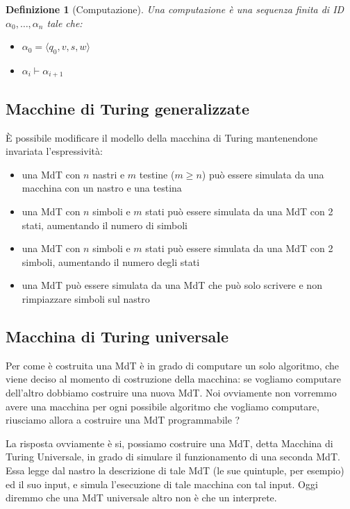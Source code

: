 \documentclass[a4paper,titlepage]{article}
\newtheorem{definition}{Definizione}[section]
\theoremstyle{definition}
\begin{document}
\begin{definition}[Computazione]
	Una computazione è una sequenza finita di ID $\alpha_0,\dots,\alpha_n$ tale che:
	\begin{itemize}
		\item $\alpha_0 = \langle q_0,v,s,w\rangle$
		\item $\alpha_i\vdash\alpha_{i+1}$
	\end{itemize}
\end{definition}

\subsection{Macchine di Turing generalizzate}
È possibile modificare il modello della macchina di Turing mantenendone invariata l'espressività:
\begin{itemize}
	\item una MdT con $n$ nastri e $m$ testine ($m\geq n$) può essere simulata da una macchina con un nastro e una testina
	\item una MdT con $n$ simboli e $m$ stati può essere simulata da una MdT con 2 stati, aumentando il numero di simboli
	\item una MdT con $n$ simboli e $m$ stati può essere simulata da una MdT con 2 simboli, aumentando il numero degli stati 
	\item una MdT può essere simulata da una MdT che può solo scrivere e non rimpiazzare simboli sul nastro
\end{itemize}

\subsection{Macchina di Turing universale}
Per come è costruita una MdT è in grado di computare un solo algoritmo, che viene deciso al momento di costruzione della macchina: se vogliamo computare dell'altro dobbiamo costruire una nuova MdT. Noi ovviamente non vorremmo avere una macchina per ogni possibile algoritmo che vogliamo computare, riusciamo allora a costruire una MdT programmabile ?

La risposta ovviamente è si, possiamo costruire una MdT, detta Macchina di Turing Universale, in grado di simulare il funzionamento di una seconda MdT. Essa legge dal nastro la descrizione di tale MdT (le sue quintuple, per esempio) ed il suo input, e simula l'esecuzione di tale macchina con tal input. Oggi diremmo che una MdT universale altro non è che un interprete. 
\end{document}
